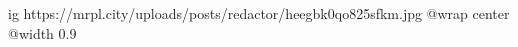  
 
 
 
 

\ifcmt
  ig https://mrpl.city/uploads/posts/redactor/heegbk0qo825sfkm.jpg
  @wrap center
  @width 0.9
\fi
